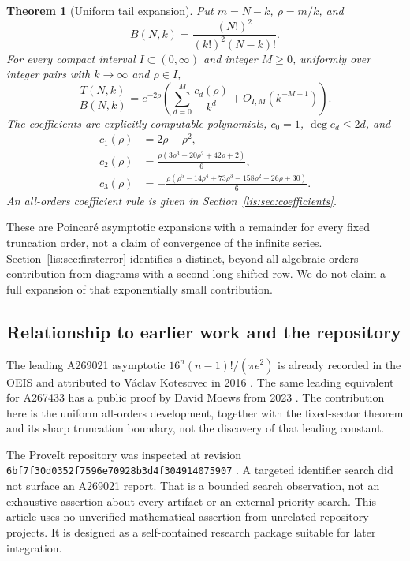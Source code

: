 \documentclass[11pt,letterpaper]{article}
\numberwithin{equation}{section}
\newtheorem{theorem}{Theorem}[section]
\theoremstyle{definition}
\begin{document}
\begin{theorem}[Uniform tail expansion]\label{lis:thm:asymptotic}
Put $m=N-k$, $\rho=m/k$, and
\begin{equation}
 B(N,k)=\frac{(N!)^2}{(k!)^2(N-k)!}.
 \label{lis:eq:base}
\end{equation}
For every compact interval $I\subset(0,\infty)$ and integer $M\ge0$,
uniformly over integer pairs with $k\to\infty$ and $\rho\in I$,
\begin{equation}
 \frac{T(N,k)}{B(N,k)}
 =e^{-2\rho}\left(\sum_{d=0}^{M}\frac{c_d(\rho)}{k^d}
                    +O_{I,M}(k^{-M-1})\right).\label{lis:eq:allorders}
\end{equation}
The coefficients are explicitly computable polynomials, $c_0=1$,
$\deg c_d\le2d$, and
\begin{align}
 c_1(\rho)&=2\rho-\rho^2,\label{lis:eq:c1}\\
 c_2(\rho)&=\frac{\rho(3\rho^3-20\rho^2+42\rho+2)}6,\label{lis:eq:c2}\\
 c_3(\rho)&=-\frac{\rho(\rho^5-14\rho^4+73\rho^3-158\rho^2
                                  +26\rho+30)}6.\label{lis:eq:c3}
\end{align}
An all-orders coefficient rule is given in Section~\ref{lis:sec:coefficients}.
\end{theorem}

These are Poincar\'e asymptotic expansions with a remainder for every
fixed truncation order, not a claim of convergence of the infinite
series. Section~\ref{lis:sec:firsterror} identifies a distinct,
beyond-all-algebraic-orders contribution from diagrams with a second
long shifted row. We do not claim a full expansion of that exponentially
small contribution.

\subsection{Relationship to earlier work and the repository}
The leading A269021 asymptotic $16^n(n-1)!/(\pi e^2)$ is already recorded
in the OEIS and attributed to V\'aclav Kotesovec in 2016 \cite{oeis269}.
The same leading equivalent for A267433 has a public proof by David
Moews from 2023 \cite{Moews}. The contribution here is the uniform
all-orders development, together with the fixed-sector theorem and
its sharp truncation boundary, not the discovery of that leading
constant.

The ProveIt repository was inspected at revision
\texttt{6bf7f30d0352f7596e70928b3d4f304914075907} \cite{repo}.
A targeted identifier search did not surface an A269021 report. That is
a bounded search observation, not an exhaustive assertion about every
artifact or an external priority search. This article uses no unverified
mathematical assertion from unrelated repository projects. It is designed
as a self-contained research package suitable for later integration.
\end{document}
